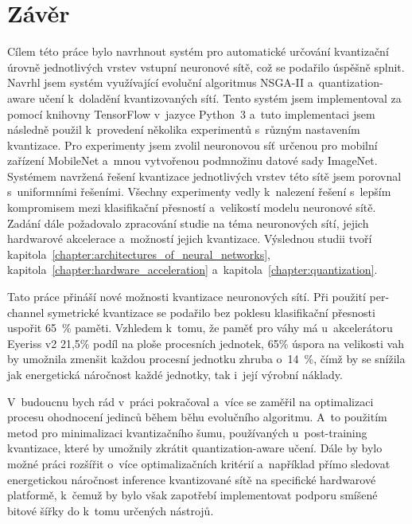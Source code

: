 \chapter{Závěr}
\label{zaver}

Cílem této práce bylo navrhnout systém pro automatické určování kvantizační úrovně jednotlivých vrstev vstupní neuronové sítě, což se podařilo úspěšně splnit. Navrhl jsem systém využívající evoluční algoritmus NSGA-II a~quantization-aware učení k~doladění kvantizovaných sítí. Tento systém jsem implementoval za pomocí knihovny TensorFlow v~jazyce Python~3 a~tuto implementaci jsem následně použil k~provedení několika experimentů s~různým nastavením kvantizace. Pro experimenty jsem zvolil neuronovou síť určenou pro mobilní zařízení MobileNet a~mnou vytvořenou podmnožinu datové sady ImageNet. Systémem navržená řešení kvantizace jednotlivých vrstev této sítě jsem porovnal s~uniformními řešeními. Všechny experimenty vedly k~nalezení řešení s~lepším kompromisem mezi klasifikační přesností a~velikostí modelu neuronové sítě. Zadání dále požadovalo zpracování studie na téma neuronových sítí, jejich hardwarové akcelerace a~možností jejich kvantizace. Výslednou studii tvoří kapitola~\ref{chapter:architectures_of_neural_networks}, kapitola~\ref{chapter:hardware_acceleration} a~kapitola~\ref{chapter:quantization}.

Tato práce přináší nové možnosti kvantizace neuronových sítí. Při použití per-channel symetrické kvantizace se podařilo bez poklesu klasifikační přesnosti uspořit 65~\% paměti. Vzhledem k~tomu, že paměť pro váhy má u~akcelerátoru Eyeriss v2 21,5\% podíl na ploše procesních jednotek, 65\% úspora na velikosti vah by umožnila zmenšit každou procesní jednotku zhruba o~14~\%, čímž by se snížila jak energetická náročnost každé jednotky, tak i~její výrobní náklady.

V~budoucnu bych rád v~práci pokračoval a~více se zaměřil na optimalizaci procesu ohodnocení jedinců během běhu evolučního algoritmu. A~to použitím metod pro minimalizaci kvantizačního šumu, používaných u~post-training kvantizace, které by umožnily zkrátit quantization-aware učení. Dále by bylo možné práci rozšířit o~více optimalizačních kritérií a~například přímo sledovat energetickou náročnost inference kvantizované sítě na specifické hardwarové platformě, k~čemuž by bylo však zapotřebí implementovat podporu smíšené bitové šířky do k~tomu určených nástrojů.

